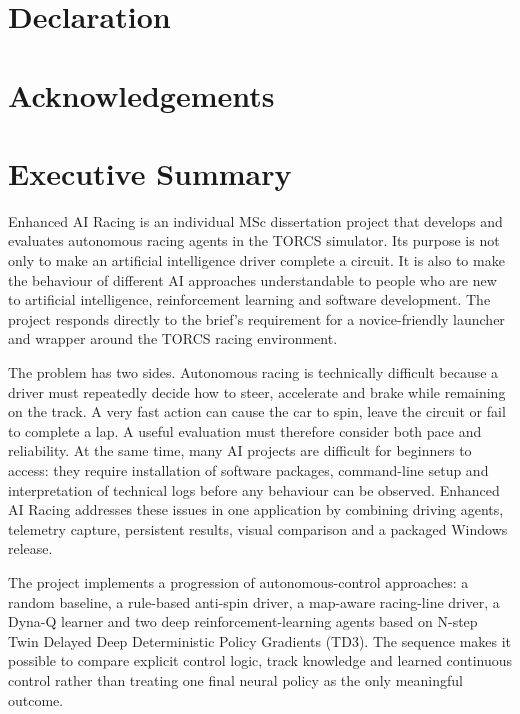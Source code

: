
\section*{Declaration}

\section*{Acknowledgements}

\section*{Executive Summary}

Enhanced AI Racing is an individual MSc dissertation project that develops and evaluates autonomous racing agents in the TORCS simulator. Its purpose is not only to make an artificial intelligence driver complete a circuit. It is also to make the behaviour of different AI approaches understandable to people who are new to artificial intelligence, reinforcement learning and software development. The project responds directly to the brief's requirement for a novice-friendly launcher and wrapper around the TORCS racing environment.

The problem has two sides. Autonomous racing is technically difficult because a driver must repeatedly decide how to steer, accelerate and brake while remaining on the track. A very fast action can cause the car to spin, leave the circuit or fail to complete a lap. A useful evaluation must therefore consider both pace and reliability. At the same time, many AI projects are difficult for beginners to access: they require installation of software packages, command-line setup and interpretation of technical logs before any behaviour can be observed. Enhanced AI Racing addresses these issues in one application by combining driving agents, telemetry capture, persistent results, visual comparison and a packaged Windows release.

The project implements a progression of autonomous-control approaches: a random baseline, a rule-based anti-spin driver, a map-aware racing-line driver, a Dyna-Q learner and two deep reinforcement-learning agents based on N-step Twin Delayed Deep Deterministic Policy Gradients (TD3). The sequence makes it possible to compare explicit control logic, track knowledge and learned continuous control rather than treating one final neural policy as the only meaningful outcome.

